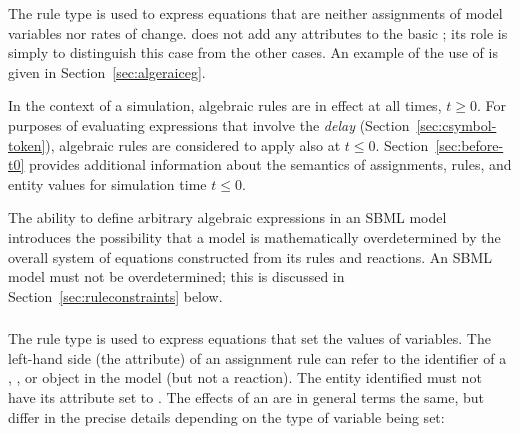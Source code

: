 The rule type \AlgebraicRule is used to express equations that are
neither assignments of model variables nor rates of change.
\AlgebraicRule does not add any attributes to the basic \Rule; its
role is simply to distinguish this case from the other cases.  An
example of the use of \AlgebraicRule is given in
Section~\ref{sec:algeraiceg}.

In the context of a simulation, algebraic rules are in effect at
all times, $t \geq 0$.  For purposes of evaluating expressions
that involve the \emph{delay} 
(Section~\ref{sec:csymbol-token}), algebraic rules are considered
to apply also at $t \leq 0$.  Section~\ref{sec:before-t0} provides
additional information about the semantics of assignments, rules,
and entity values for simulation time $t \leq 0$.


The ability to define arbitrary algebraic expressions in an SBML
model introduces the possibility that a model is mathematically
overdetermined by the overall system of equations constructed from
its rules and reactions.  An SBML model must not be
overdetermined; this is discussed in
Section~\ref{sec:ruleconstraints} below.


\subsubsection{}
\label{sec:assignmentrule}

The rule type \AssignmentRule is used to express equations that
set the values of variables.  The left-hand side (the
 attribute) of an assignment rule can refer to the
identifier of a \Species, \Compartment, or \Parameter object in
the model (but not a reaction).  The entity identified must not
have its  attribute set to .  The effects of
an \AssignmentRule are in general terms the same, but differ in
the precise details depending on the type of variable being set:

